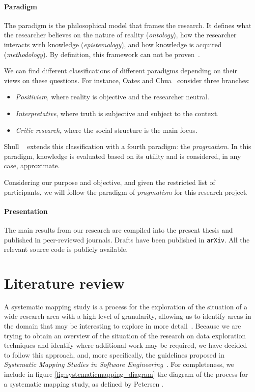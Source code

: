 \paragraph{Paradigm}
\label{method:paradigm}
The paradigm is the philosophical model that frames the research.
It defines what the researcher believes on the nature
of reality (\emph{ontology}), how the researcher interacts with
knowledge (\emph{epistemology}), and how knowledge is acquired
(\emph{methodology}). By definition, this framework can not be proven~\cite{Guba1990,guba_competing_1994}.

We can find different classifications of different paradigms depending on
their views on these questions. For instance, Oates and Chua~\cite{Chua1986}
consider three branches:

\begin{itemize}
    \item \emph{Positivism}, where reality is objective and the researcher neutral.
    \item \emph{Interpretative}, where truth is subjective and subject to the context.
    \item \emph{Critic research}, where the social structure is the main focus.
\end{itemize}

Shull \etal~\cite{Shull2008} extends this classification with a fourth paradigm:
the \emph{pragmatism}. In this paradigm, knowledge is evaluated based on its
utility and is considered, in any case, approximate.

Considering our purpose and objective, and given the restricted list of
participants, we will follow the paradigm of \emph{pragmatism} for this research project.

\paragraph{Presentation}
\label{method:presentation}
The main results from our research are compiled into the present thesis
and published in peer-reviewed journals. Drafts have been published in \texttt{arXiv}.
All the relevant source code is publicly available.

\section{Literature review}
\label{sec:method_literature_review}
A systematic mapping study is a process for the exploration of
the situation of a wide research area with a high level of granularity,
allowing us to identify areas in the domain that may be interesting to
explore in more detail~\cite{Kitchenham2007}. Because we are trying to obtain
an overview of the situation of the research on data exploration techniques
and identify where additional work may be required, we have decided to follow this
approach, and, more specifically, the guidelines proposed in
\emph{Systematic Mapping Studies in Software Engineering}~\cite{Petersen2007}.
For completeness, we include in figure \ref{fig:systematicmapping_diagram} the
diagram of the process for a systematic mapping study, as defined by
Petersen \etal.

